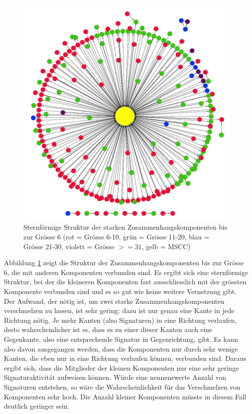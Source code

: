 \begin{figure}[th!]
  \centering
  \includegraphics[scale=0.7]{images/component-metagraph-8.pdf}
  \caption{Sternf\"ormige Struktur der starken
    Zusammenhangskomponenten bis zur Grösse 6 (rot = Grösse 6-10, grün
    = Grösse 11-20, blau = Grösse 21-30, violett = Grösse $>= 31$,
    gelb = MSCC)}
  \label{fig:komponenten-struktur}
\end{figure}

Abbildung \ref{fig:komponenten-struktur} zeigt die Struktur der
Zusammenhangskomponenten bis zur Gr\"osse 6, die mit anderen
Komponenten verbunden sind. Es ergibt sich eine sternf\"ormige
Struktur, bei der die kleineren Komponenten fast ausschliesslich mit
der gr\"ossten Komponente verbunden sind und es so gut wie keine
weitere Vernetzung gibt. Der Aufwand, der n\"otig ist, um zwei starke
Zusammenhangskomponenten verschmelzen zu lassen, ist sehr gering: dazu
ist nur genau eine Kante in jede Richtung n\"otig. Je mehr Kanten
(also Signaturen) in eine Richtung verlaufen, desto wahrscheinlicher
ist es, dass es zu einer dieser Kanten auch eine Gegenkante, also eine
entsprechende Signatur in Gegenrichtung, gibt. Es kann also davon
ausgegangen werden, dass die Komponenten nur durch sehr wenige Kanten,
die eben nur in eine Richtung verlaufen k\"onnen, verbunden
sind. Daraus ergibt sich, dass die Mitglieder der kleinen Komponenten
nur eine sehr geringe Signaturaktivit\"at aufweisen k\"onnen. W\"urde
eine nennenswerte Anzahl von Signaturen entstehen, so w\"are die
Wahrscheinlichkeit f\"ur das Verschmelzen von Komponenten sehr
hoch. Die Anzahl kleiner Komponenten m\"usste in diesem Fall deutlich
geringer sein.

